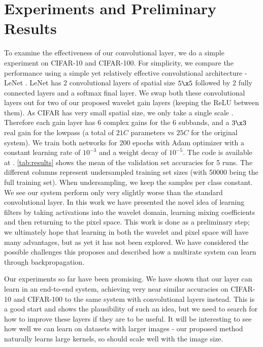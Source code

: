 \documentclass[9pt]{article}
\begin{document}
\section{Experiments and Preliminary Results}\label{sec:results}
To examine the effectiveness of our convolutional layer, we do a simple experiment on CIFAR-10 and
CIFAR-100. For simplicity, we compare the performance using a simple yet relatively effective convolutional
architecture - LeNet \cite{lecun_gradient-based_1998}. LeNet has 2 convolutional layers of spatial
size $5\x 5$ followed by
2 fully connected layers and a softmax final layer. We swap both these convolutional
layers out for two of our proposed wavelet gain layers (keeping the ReLU between them). As CIFAR has
very small spatial size, we only take a single scale \DTCWT\@. Therefore each gain layer has $6$ complex gains
for the 6 subbands, and a $3\x 3$ real gain for the lowpass (a total of $21C$ parameters vs $25C$
for the original system). We train both networks for 200 epochs with Adam
\cite{kingma_adam:_2014} optimizer with a constant learning rate of $10^{-3}$ and a weight decay of
$10^{-5}$. The code is available at \cite{cotter_dtcwt_2018}. \autoref{tab:results} shows the
mean of the validation set accuracies for 5 runs. The different columns represent undersampled
training set sizes (with 50000 being the full training set). When undersampling, we keep the samples
per class constant. We see our system perform only very slightly worse than the standard
convolutional layer. 
In this work we have presented the novel idea of learning filters by taking activations into the
wavelet domain, learning mixing coefficients and then returning to the pixel space. This work is
done as a preliminary step; we ultimately hope that learning in both the wavelet and pixel space
will have many advantages, but as yet it has not been explored. We have considered the possible
challenges this proposes and described how a multirate system can learn through backpropagation.  

Our experiments so far have been promising. We have shown that our layer can learn in an
end-to-end system, achieving very near similar accuracies on CIFAR-10 and CIFAR-100 to the same system with
convolutional layers instead. This is a good start and shows the plausibility of such an idea, 
but we need to search for how to improve these layers if they are to be useful. 
It will be interesting to see how well we can learn on datasets with larger images
- our proposed method naturally learns large kernels, so should scale well with the image size.
\end{document}
